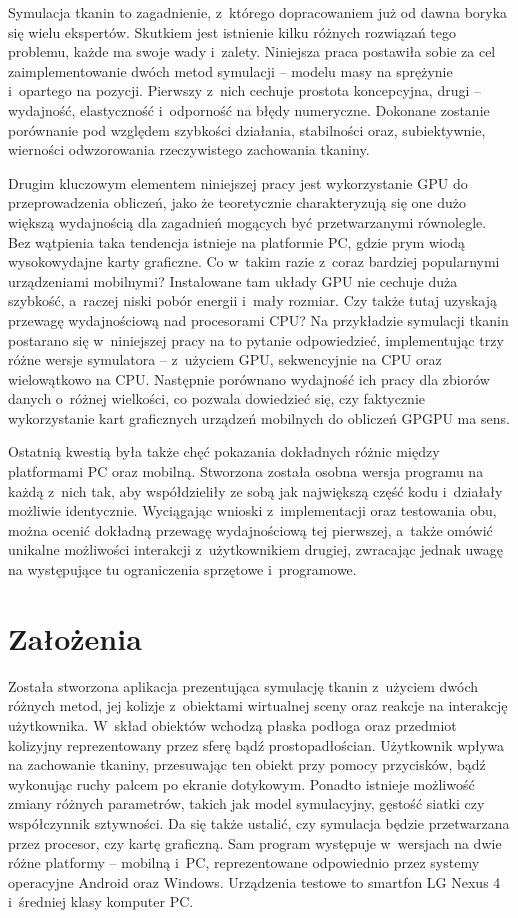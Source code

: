 	Symulacja tkanin to zagadnienie, z~którego dopracowaniem już od dawna boryka się wielu ekspertów. Skutkiem jest istnienie kilku różnych rozwiązań tego problemu, każde ma swoje wady i~zalety. Niniejsza praca postawiła sobie za cel zaimplementowanie dwóch metod symulacji -- modelu masy na sprężynie i~opartego na pozycji. Pierwszy z~nich cechuje prostota koncepcyjna, drugi -- wydajność, elastyczność i~odporność na błędy numeryczne. Dokonane zostanie porównanie pod względem szybkości działania, stabilności oraz, subiektywnie, wierności odwzorowania rzeczywistego zachowania tkaniny.
	
	Drugim kluczowym elementem niniejszej pracy jest wykorzystanie GPU do przeprowadzenia obliczeń, jako że teoretycznie charakteryzują się one dużo większą wydajnością dla zagadnień mogących być przetwarzanymi równolegle. Bez wątpienia taka tendencja istnieje na platformie PC, gdzie prym wiodą wysokowydajne karty graficzne. Co w~takim razie z~coraz bardziej popularnymi urządzeniami mobilnymi? Instalowane tam układy GPU nie cechuje duża szybkość, a~raczej niski pobór energii i~mały rozmiar. Czy także tutaj uzyskają przewagę wydajnościową nad procesorami CPU? Na przykładzie symulacji tkanin postarano się w~niniejszej pracy na to pytanie odpowiedzieć, implementując trzy różne wersje symulatora -- z~użyciem GPU, sekwencyjnie na CPU oraz wielowątkowo na CPU. Następnie porównano wydajność ich pracy dla zbiorów danych o~różnej wielkości, co pozwala dowiedzieć się, czy faktycznie wykorzystanie kart graficznych urządzeń mobilnych do obliczeń GPGPU ma sens.
	
	Ostatnią kwestią była także chęć pokazania dokładnych różnic między platformami PC oraz mobilną. Stworzona została osobna wersja programu na każdą z~nich tak, aby współdzieliły ze sobą jak największą część kodu i~działały możliwie identycznie. Wyciągając wnioski z~implementacji oraz testowania obu, można ocenić dokładną przewagę wydajnościową tej pierwszej, a~także omówić unikalne możliwości interakcji z~użytkownikiem drugiej, zwracając jednak uwagę na występujące tu ograniczenia sprzętowe i~programowe. 
	
	\section{Założenia}
	\label{t:wprowadzenie:zalozenia}
	
	Została stworzona aplikacja prezentująca symulację tkanin z~użyciem dwóch różnych metod, jej kolizje z~obiektami wirtualnej sceny oraz reakcje na interakcję użytkownika. W~skład obiektów wchodzą płaska podłoga oraz przedmiot kolizyjny reprezentowany przez sferę bądź prostopadłościan. Użytkownik wpływa na zachowanie tkaniny, przesuwając ten obiekt przy pomocy przycisków, bądź wykonując ruchy palcem po ekranie dotykowym. Ponadto istnieje możliwość zmiany różnych parametrów, takich jak model symulacyjny, gęstość siatki czy współczynnik sztywności. Da się także ustalić, czy symulacja będzie przetwarzana przez procesor, czy kartę graficzną. Sam program występuje w~wersjach na dwie różne platformy -- mobilną i~PC, reprezentowane odpowiednio przez systemy operacyjne Android oraz Windows. Urządzenia testowe to smartfon LG Nexus 4 i~średniej klasy komputer PC.
	
